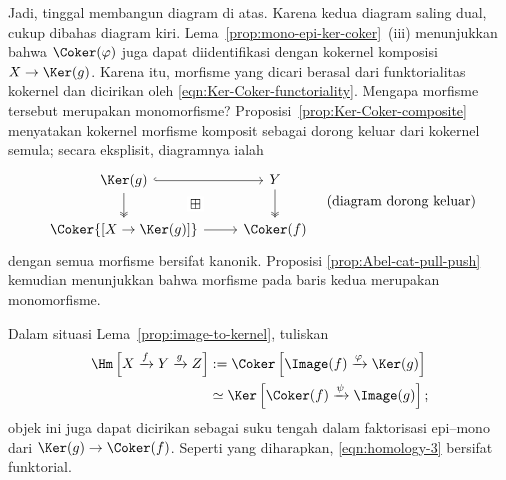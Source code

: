 \begin{bukti}
	Jadi, tinggal membangun diagram di atas. Karena kedua diagram saling
	dual, cukup dibahas diagram kiri.
	Lema~\ref{prop:mono-epi-ker-coker}~(iii) menunjukkan bahwa
	$\Coker(\varphi)$ juga dapat diidentifikasi dengan kokernel komposisi
	$X \to \Ker(g)$. Karena itu, morfisme yang dicari berasal dari
	funktorialitas kokernel dan dicirikan oleh
	\eqref{eqn:Ker-Coker-functoriality}. Mengapa morfisme tersebut merupakan
	monomorfisme? Proposisi~\ref{prop:Ker-Coker-composite} menyatakan kokernel
	morfisme komposit sebagai dorong keluar dari kokernel semula; secara
	eksplisit, diagramnya ialah
	\[\begin{tikzcd}
		\Ker(g) \arrow[hookrightarrow, r] \arrow[twoheadrightarrow, d] & Y \arrow[twoheadrightarrow, d] \\
		\Coker{[X \to \Ker(g)]} \arrow[r] & \Coker(f) \arrow[phantom, lu, "\boxplus" description]
	\end{tikzcd} \quad \text{(diagram dorong keluar)}\]
	dengan semua morfisme bersifat kanonik. Proposisi
	\ref{prop:Abel-cat-pull-push} kemudian menunjukkan bahwa morfisme pada baris
	kedua merupakan monomorfisme.
\end{bukti}

Dalam situasi Lema~\ref{prop:image-to-kernel}, tuliskan
\begin{equation}\label{eqn:homology-3}\begin{aligned}
	\Hm\left[ X \xrightarrow{f} Y \xrightarrow{g} Z \right] & := \Coker\left[ \Image(f) \xrightarrow{\varphi} \Ker(g) \right] \\
	& \simeq \Ker\left[ \Coker(f) \xrightarrow{\psi} \Image(g) \right] ;
\end{aligned}\end{equation}
objek ini juga dapat dicirikan sebagai suku tengah dalam faktorisasi epi--mono
dari $\Ker(g) \to \Coker(f)$. Seperti yang diharapkan,
\eqref{eqn:homology-3} bersifat funktorial.

